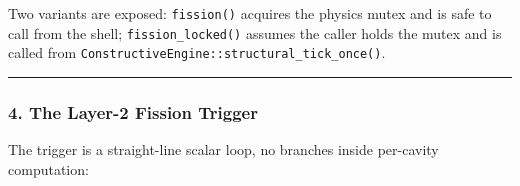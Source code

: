\documentclass[
  11pt,
  a4paper,
]{article}
\begin{document}
Two variants are exposed: \texttt{fission()} acquires the physics mutex
and is safe to call from the shell; \texttt{fission\_locked()} assumes
the caller holds the mutex and is called from
\texttt{ConstructiveEngine::structural\_tick\_once()}.

\begin{center}\rule{0.5\linewidth}{0.5pt}\end{center}

\subsubsection{4. The Layer-2 Fission
Trigger}\label{the-layer-2-fission-trigger}

The trigger is a straight-line scalar loop, no branches inside
per-cavity computation:
\end{document}
